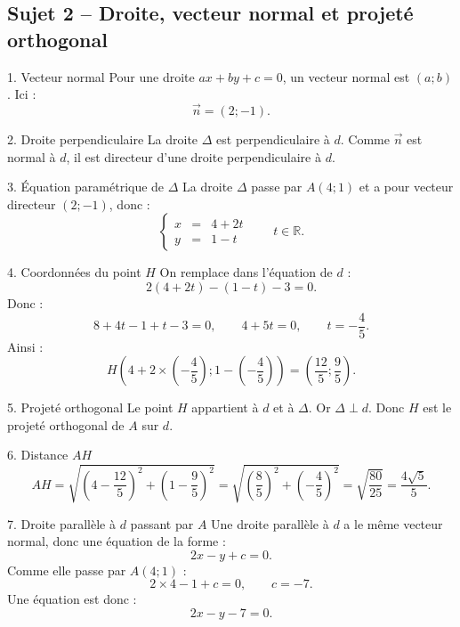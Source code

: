 \documentclass[11pt,a4paper]{article}
\begin{document}
\subsection*{Sujet 2 -- Droite, vecteur normal et projeté orthogonal}
\begin{correctionbox}{1. Vecteur normal}
Pour une droite $ax+by+c=0$, un vecteur normal est $(a;b)$. Ici :
\[
\vec n=(2;-1).
\]
\end{correctionbox}
\begin{correctionbox}{2. Droite perpendiculaire}
La droite $\Delta$ est perpendiculaire à $d$. Comme $\vec n$ est normal à $d$, il est directeur d’une droite perpendiculaire à $d$.
\end{correctionbox}
\begin{correctionbox}{3. Équation paramétrique de $\Delta$}
La droite $\Delta$ passe par $A(4;1)$ et a pour vecteur directeur $(2;-1)$, donc :
\[
\left\{\begin{array}{rcl}
x&=&4+2t\\
y&=&1-t
\end{array}\right.
\qquad t\in\mathbb R.
\]
\end{correctionbox}
\begin{correctionbox}{4. Coordonnées du point $H$}
On remplace dans l’équation de $d$ :
\[
2(4+2t)-(1-t)-3=0.
\]
Donc :
\[
8+4t-1+t-3=0,
\qquad 4+5t=0,
\qquad t=-\frac45.
\]
Ainsi :
\[
H\left(4+2\times\left(-\frac45\right);1-\left(-\frac45\right)\right)
=\left(\frac{12}{5};\frac95\right).
\]
\end{correctionbox}
\begin{correctionbox}{5. Projeté orthogonal}
Le point $H$ appartient à $d$ et à $\Delta$. Or $\Delta\perp d$. Donc $H$ est le projeté orthogonal de $A$ sur $d$.
\end{correctionbox}
\begin{correctionbox}{6. Distance $AH$}
\[
AH=\sqrt{\left(4-\frac{12}{5}\right)^2+\left(1-\frac95\right)^2}
=\sqrt{\left(\frac85\right)^2+\left(-\frac45\right)^2}
=\sqrt{\frac{80}{25}}
=\frac{4\sqrt5}{5}.
\]
\end{correctionbox}
\begin{correctionbox}{7. Droite parallèle à $d$ passant par $A$}
Une droite parallèle à $d$ a le même vecteur normal, donc une équation de la forme :
\[
2x-y+c=0.
\]
Comme elle passe par $A(4;1)$ :
\[
2\times4-1+c=0,
\qquad c=-7.
\]
Une équation est donc :
\[
2x-y-7=0.
\]
\end{correctionbox}
\end{document}
